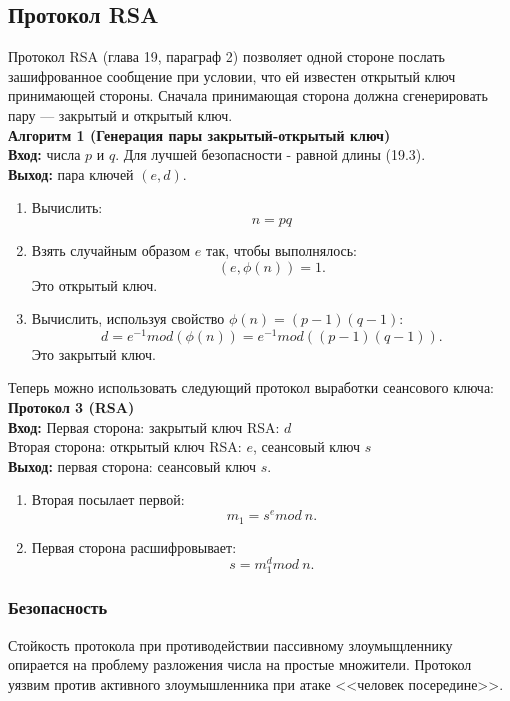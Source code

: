 \subsection{Протокол RSA}
Протокол RSA \autocite{Shnayer}(глава 19, параграф 2) позволяет одной стороне послать зашифрованное сообщение при условии, что ей известен открытый ключ принимающей стороны. Сначала принимающая сторона должна сгенерировать пару --- закрытый и открытый ключ.\\
\textbf{Алгоритм 1 (Генерация пары закрытый-открытый ключ)}\\
\hspace*{10mm}\textbf{Вход:} числа $p$ и $q$. Для лучшей безопасности - равной длины \autocite{Shnayer}(19.3).\\
\hspace*{10mm}\textbf{Выход:} пара ключей $(e,d).$ 
\begin{enumerate}
	\item Вычислить:
	$$n = pq$$
	\item Взять случайным образом $e$ так, чтобы выполнялось:
	$$(e,\phi(n)) = 1.$$
	Это открытый ключ.
	\item Вычислить, используя свойство $\phi(n)=(p-1)(q-1)$:
	$$d=e^{-1}mod(\phi(n)) = e^{-1}mod((p-1)(q-1)).$$
	Это закрытый ключ.
\end{enumerate}
Теперь можно использовать следующий протокол выработки сеансового ключа:\\
\textbf{Протокол 3 (RSA)}\\
\hspace*{10mm}\textbf{Вход:}
Первая сторона: закрытый ключ RSA: $d$\\
Вторая сторона: открытый ключ RSA: $e$, сеансовый ключ $s$\\
\hspace*{10mm}\textbf{Выход:} первая сторона: сеансовый ключ $s$.\\
\begin{enumerate}
	\item Вторая посылает первой:
	$$m_{1} = s^{e}mod\ n.$$
	\item Первая сторона расшифровывает:
	$$s = m_{1}^{d}mod\ n.$$
\end{enumerate}
\subsubsection{Безопасность}
Стойкость протокола при противодействии пассивному злоумыщленнику опирается на проблему разложения числа на простые множители. Протокол уязвим против активного злоумышленника при атаке <<человек посередине>>.